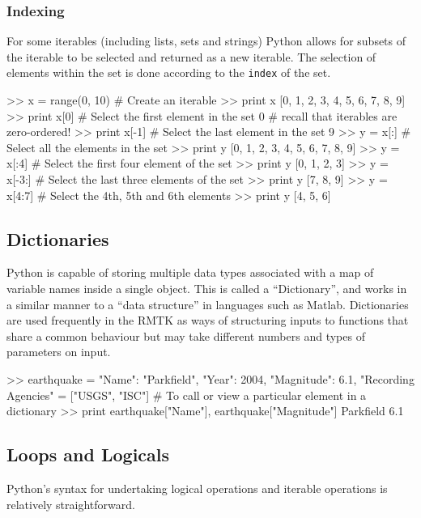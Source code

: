 \subsubsection{Indexing}

For some iterables (including lists, sets and strings) Python allows for subsets of the iterable to be selected and returned as a new iterable. The selection of elements within the set is done according to the \verb=index= of the set. 

\begin{python}[frame=single]
>> x = range(0, 10)  # Create an iterable
>> print x
[0, 1, 2, 3, 4, 5, 6, 7, 8, 9]
>> print x[0] # Select the first element in the set
0             # recall that iterables are zero-ordered!
>> print x[-1] # Select the last element in the set
9
>> y = x[:] # Select all the elements in the set
>> print y
[0, 1, 2, 3, 4, 5, 6, 7, 8, 9]
>> y = x[:4]  # Select the first four element of the set
>> print y
[0, 1, 2, 3]
>> y = x[-3:] # Select the last three elements of the set
>> print y
[7, 8, 9]
>> y = x[4:7] # Select the 4th, 5th and 6th elements
>> print y
[4, 5, 6]
\end{python}

\subsection{Dictionaries}

Python is capable of storing multiple data types associated with a map of variable names inside a single object. This is called a ``Dictionary'', and works in a similar manner to a ``data structure'' in languages such as Matlab. Dictionaries are used frequently in the RMTK as ways of structuring inputs to functions that share a common behaviour but may take different numbers and types of parameters on input.

\begin{python}[frame=single]
>> earthquake = {"Name": "Parkfield",
                 "Year": 2004,
                 "Magnitude": 6.1,
                 "Recording Agencies" = ["USGS", "ISC"]}
# To call or view a particular element in a dictionary
>> print earthquake["Name"], earthquake["Magnitude"]
Parkfield 6.1
\end{python}

\subsection{Loops and Logicals}

Python's syntax for undertaking logical operations and iterable operations is relatively straightforward.

